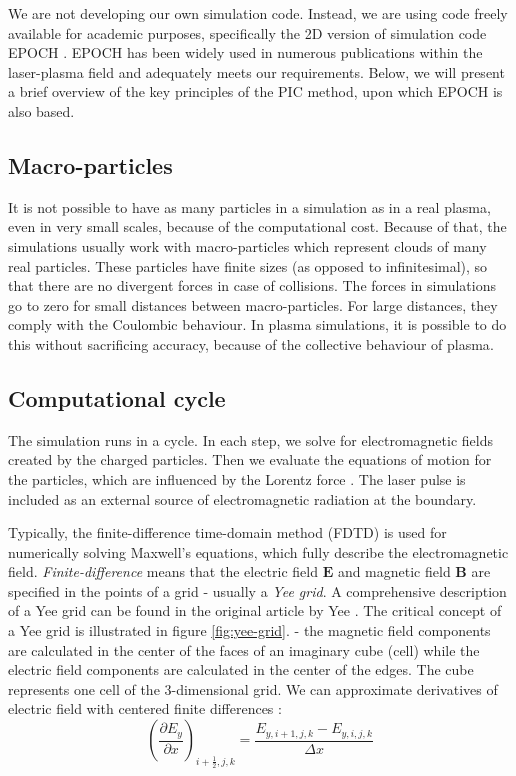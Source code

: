 We are not developing our own simulation code. Instead, we are using code freely available for academic purposes, specifically the 2D version of simulation code EPOCH \cite{arber2015}. EPOCH has been widely used in numerous publications within the laser-plasma field and adequately meets our requirements. Below, we will present a brief overview of the key principles of the PIC method, upon which EPOCH is also based.

\subsection*{Macro-particles}
It is not possible to have as many particles in a simulation as in a real plasma, even in very small scales, because of the computational cost. Because of that, the simulations usually work with macro-particles which represent clouds of many real particles. These particles have finite sizes (as opposed to infinitesimal), so that there are no divergent forces in case of collisions. The forces in simulations go to zero for small distances between macro-particles. For large distances, they comply with the Coulombic behaviour. In plasma simulations, it is possible to do this without sacrificing accuracy, because of the collective behaviour of plasma\cite{fonseca2009}.

\subsection*{Computational cycle}
The simulation runs in a cycle. In each step, we solve for electromagnetic fields created by the charged particles. Then we evaluate the equations of motion for the particles, which are influenced by the Lorentz force \cite{birdsall1985}. The laser pulse is included as an external source of electromagnetic radiation at the boundary.

Typically, the finite-difference time-domain method (FDTD) is used for numerically solving Maxwell's equations, which fully describe the electromagnetic field. \textit{Finite-difference} means that the electric field $\bm{E}$ and magnetic field $\bm{B}$ are specified in the points of a grid - usually a \textit{Yee grid}. A comprehensive description of a Yee grid can be found in the original article by Yee \cite{yee1966}. The critical concept of a Yee grid is illustrated in figure \ref{fig:yee-grid}. - the magnetic field components are calculated in the center of the faces of an imaginary cube (cell) while the electric field components are calculated in the center of the edges. The cube represents one cell of the 3-dimensional grid. We can approximate derivatives of electric field with centered finite differences \cite{arber2015}:
\begin{equation}
	\label{eq:num-der}
	\left(\frac{\partial E_y}{\partial x}\right)_{i+\frac{1}{2},j,k} = \frac{E_{y,i+1,j,k}-E_{y,i,j,k}}{\Delta x} 
\end{equation}

